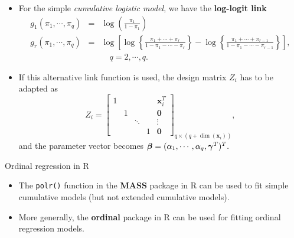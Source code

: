 \documentclass{beamer}
\newenvironment{wideitemize}%
  {\begin{itemize}%
    \setlength{\parskip}{1em}}%
  {\end{itemize}}
\begin{document}
\begin{frame}

\begin{wideitemize}
\item
For the simple \textit{cumulative logistic model}, we have the \textbf{log-logit link} 
 {\footnotesize
\begin{eqnarray*}
g_1(\pi_1,\cdots,\pi_q) &=& \log\left(\frac{\pi_1}{1-\pi_1}\right) \\
g_r(\pi_1,\cdots,\pi_q) &=& \log\left[\log\left\{\frac{\pi_1+\cdots+\pi_r}{1-\pi_1-\cdots-\pi_r}\right\} -
\log\left\{\frac{\pi_1+\cdots+\pi_{r-1}}{1-\pi_1-\cdots-\pi_{r-1}}\right\}\right], \\ & & \quad q=2,\cdots,q.
\end{eqnarray*}}
\item
If this alternative link function is used, the design matrix $Z_i$ has to be adapted as
 {\footnotesize
$$Z_i=\left[\begin{array}{ccccc}1 & & & & \textbf{x}_i^T \\
& 1 & & &  \textbf{0} \\ & & \ddots & & \vdots \\
& & & 1 & \textbf{0}\end{array}\right]_{q\times (q+\dim(\textbf{x}_i))},$$}
and the parameter vector becomes
$\mbox{\boldmath $\beta$}=(\alpha_1,\cdots, \alpha_q, \mbox{\boldmath $\gamma$}^T)^T.$

\end{wideitemize}
\end{frame}

\begin{frame}{Ordinal regression in R}
\begin{wideitemize}

\item
The \texttt{polr()} function in the \textbf{MASS} package in R can be used to fit simple cumulative models
(but not extended cumulative models).




\item
More generally, the \textbf{ordinal} package in R can be used for fitting ordinal regression models.

\end{wideitemize}


\end{frame}
\end{document}
